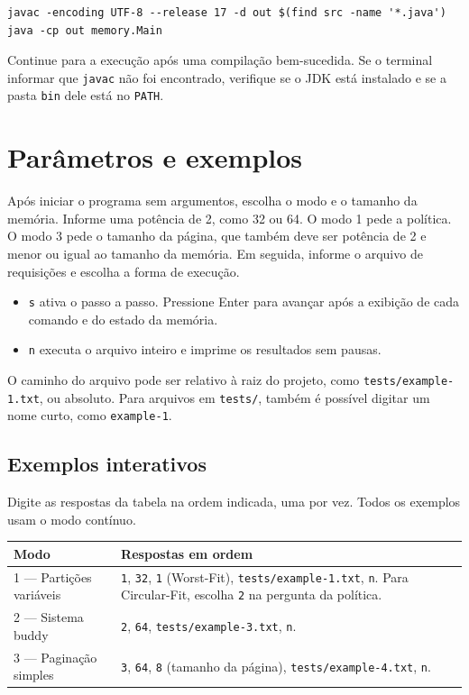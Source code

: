 \documentclass[11pt,a4paper]{article}
\newcommand{\cmd}[1]{\texttt{#1}}
\begin{document}
\begin{verbatim}
javac -encoding UTF-8 --release 17 -d out $(find src -name '*.java')
java -cp out memory.Main
\end{verbatim}

Continue para a execução após uma compilação bem-sucedida. Se o terminal
informar que \cmd{javac} não foi encontrado, verifique se o JDK está
instalado e se a pasta \cmd{bin} dele está no \cmd{PATH}.

\clearpage

\section{Parâmetros e exemplos}

Após iniciar o programa sem argumentos, escolha o modo e o tamanho
da memória. Informe uma potência de 2, como 32 ou 64. O modo 1 pede
a política. O modo 3 pede o tamanho da página, que também deve ser
potência de 2 e menor ou igual ao tamanho da memória. Em seguida,
informe o arquivo de requisições e escolha a forma de execução.

\begin{itemize}
    \item \cmd{s} ativa o passo a passo. Pressione Enter para avançar
    após a exibição de cada comando e do estado da memória.
    \item \cmd{n} executa o arquivo inteiro e imprime os resultados sem pausas.
\end{itemize}

O caminho do arquivo pode ser relativo à raiz do projeto, como
\cmd{tests/example-1.txt}, ou absoluto. Para arquivos em \cmd{tests/},
também é possível digitar um nome curto, como \cmd{example-1}.

\subsection*{Exemplos interativos}

Digite as respostas da tabela na ordem indicada, uma por vez.
Todos os exemplos usam o modo contínuo.

\begin{center}
\small
\begin{tabularx}{\linewidth}{@{}lX@{}}
\toprule
Modo & Respostas em ordem \\
\midrule
1 --- Partições variáveis & \cmd{1}, \cmd{32}, \cmd{1} (Worst-Fit),
\cmd{tests/example-1.txt}, \cmd{n}. Para Circular-Fit, escolha
\cmd{2} na pergunta da política. \\
2 --- Sistema buddy & \cmd{2}, \cmd{64}, \cmd{tests/example-3.txt}, \cmd{n}. \\
3 --- Paginação simples & \cmd{3}, \cmd{64}, \cmd{8} (tamanho da página),
\cmd{tests/example-4.txt}, \cmd{n}. \\
\bottomrule
\end{tabularx}
\end{center}
\end{document}
